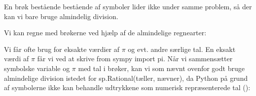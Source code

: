 \documentclass[letterpaper,10pt,english]{jupyterBook}
\begin{document}
\noindent{}

En brøk bestående bestående af symboler lider ikke under samme problem, så der kan vi bare bruge almindelig division.

\begin{sphinxVerbatim}[commandchars=\\\{\}]
  
\end{sphinxVerbatim}

\noindent{}

Vi kan regne med brøkerne ved hjælp af de almindelige regnearter:

\begin{sphinxVerbatim}[commandchars=\\\{\}]
   
   
  

   
   
  
\end{sphinxVerbatim}

\noindent{}

\noindent{}

Vi får ofte brug for eksakte værdier af \(\pi\) og evt. andre særlige tal. En eksakt værdi af \(\pi\) får vi ved at skrive from sympy import pi. Når vi sammensætter symbolske variable og \(\pi\) med tal i brøker, kan vi som nævnt ovenfor godt bruge almindelige division istedet for sp.Rational(tæller, nævner), da Python på grund af symbolerne ikke kan behandle udtrykkene som numerisk repræsenterede tal ():

\begin{sphinxVerbatim}[commandchars=\\\{\}]
   
      
\end{sphinxVerbatim}
\end{document}
